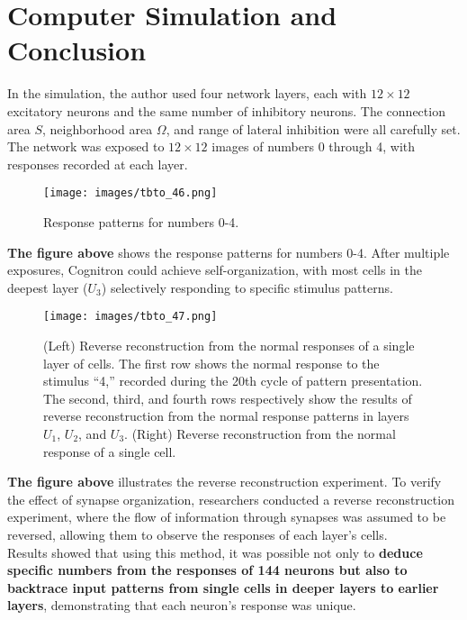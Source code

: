 \documentclass[11p,oneside]{book}
\begin{document}
\section*{Computer Simulation and Conclusion}

In the simulation, the author used four network layers, each with $12 \times 12$ excitatory neurons and the same number of inhibitory neurons. The connection area $S$, neighborhood area $\Omega$, and range of lateral inhibition were all carefully set. The network was exposed to $12 \times 12$ images of numbers 0 through 4, with responses recorded at each layer.

\begin{figure}[H]
    \centering
    \texttt{[image: images/tbto\_46.png]}
    \caption{Response patterns for numbers 0-4.}
\end{figure}

\textbf{The figure above} shows the response patterns for numbers 0-4. After multiple exposures, Cognitron could achieve self-organization, with most cells in the deepest layer ($U_3$) selectively responding to specific stimulus patterns. \\

\begin{figure}[H]
    \centering
    \texttt{[image: images/tbto\_47.png]}
    \caption{(Left) Reverse reconstruction from the normal responses of a single layer of cells. The first row shows the normal response to the stimulus “4,” recorded during the 20th cycle of pattern presentation. The second, third, and fourth rows respectively show the results of reverse reconstruction from the normal response patterns in layers $U_1$, $U_2$, and $U_3$. (Right) Reverse reconstruction from the normal response of a single cell.}
\end{figure}

\textbf{The figure above} illustrates the reverse reconstruction experiment. To verify the effect of synapse organization, researchers conducted a reverse reconstruction experiment, where the flow of information through synapses was assumed to be reversed, allowing them to observe the responses of each layer’s cells. \\

Results showed that using this method, it was possible not only to \textbf{deduce specific numbers from the responses of 144 neurons but also to backtrace input patterns from single cells in deeper layers to earlier layers}, demonstrating that each neuron’s response was unique. \\
\end{document}
